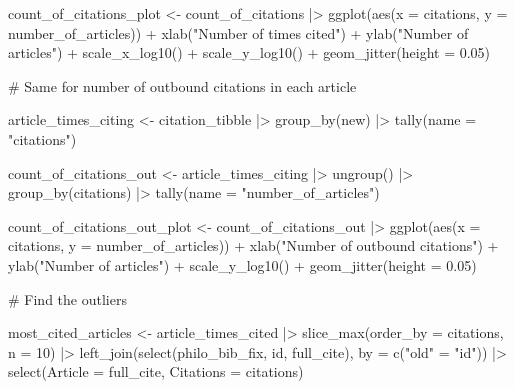 \documentclass[
  10pt,
  letterpaper,
  DIV=11,
  numbers=noendperiod,
  twoside]{scrartcl}
\newenvironment{Shaded}{\begin{snugshade}}{\end{snugshade}}
\newcommand{\AttributeTok}[1]{\textcolor[rgb]{0.40,0.45,0.13}{#1}}
\newcommand{\CommentTok}[1]{\textcolor[rgb]{0.37,0.37,0.37}{#1}}
\newcommand{\DecValTok}[1]{\textcolor[rgb]{0.68,0.00,0.00}{#1}}
\newcommand{\FloatTok}[1]{\textcolor[rgb]{0.68,0.00,0.00}{#1}}
\newcommand{\FunctionTok}[1]{\textcolor[rgb]{0.28,0.35,0.67}{#1}}
\newcommand{\NormalTok}[1]{\textcolor[rgb]{0.00,0.23,0.31}{#1}}
\newcommand{\OtherTok}[1]{\textcolor[rgb]{0.00,0.23,0.31}{#1}}
\newcommand{\SpecialCharTok}[1]{\textcolor[rgb]{0.37,0.37,0.37}{#1}}
\newcommand{\StringTok}[1]{\textcolor[rgb]{0.13,0.47,0.30}{#1}}
\begin{document}
\begin{Shaded}
\begin{Highlighting}[]
\NormalTok{count\_of\_citations\_plot }\OtherTok{\textless{}{-}}\NormalTok{ count\_of\_citations }\SpecialCharTok{|\textgreater{}}
  \FunctionTok{ggplot}\NormalTok{(}\FunctionTok{aes}\NormalTok{(}\AttributeTok{x =}\NormalTok{ citations, }\AttributeTok{y =}\NormalTok{ number\_of\_articles)) }\SpecialCharTok{+}
  \FunctionTok{xlab}\NormalTok{(}\StringTok{"Number of times cited"}\NormalTok{) }\SpecialCharTok{+}
  \FunctionTok{ylab}\NormalTok{(}\StringTok{"Number of articles"}\NormalTok{) }\SpecialCharTok{+}
  \FunctionTok{scale\_x\_log10}\NormalTok{() }\SpecialCharTok{+}
  \FunctionTok{scale\_y\_log10}\NormalTok{() }\SpecialCharTok{+}
  \FunctionTok{geom\_jitter}\NormalTok{(}\AttributeTok{height =} \FloatTok{0.05}\NormalTok{)}

\CommentTok{\# Same for number of outbound citations in each article}

\NormalTok{article\_times\_citing }\OtherTok{\textless{}{-}}\NormalTok{ citation\_tibble }\SpecialCharTok{|\textgreater{}}
  \FunctionTok{group\_by}\NormalTok{(new) }\SpecialCharTok{|\textgreater{}}
  \FunctionTok{tally}\NormalTok{(}\AttributeTok{name =} \StringTok{"citations"}\NormalTok{)}

\NormalTok{count\_of\_citations\_out }\OtherTok{\textless{}{-}}\NormalTok{ article\_times\_citing }\SpecialCharTok{|\textgreater{}}
  \FunctionTok{ungroup}\NormalTok{() }\SpecialCharTok{|\textgreater{}}
  \FunctionTok{group\_by}\NormalTok{(citations) }\SpecialCharTok{|\textgreater{}}
  \FunctionTok{tally}\NormalTok{(}\AttributeTok{name =} \StringTok{"number\_of\_articles"}\NormalTok{)}

\NormalTok{count\_of\_citations\_out\_plot }\OtherTok{\textless{}{-}}\NormalTok{ count\_of\_citations\_out }\SpecialCharTok{|\textgreater{}}
  \FunctionTok{ggplot}\NormalTok{(}\FunctionTok{aes}\NormalTok{(}\AttributeTok{x =}\NormalTok{ citations, }\AttributeTok{y =}\NormalTok{ number\_of\_articles)) }\SpecialCharTok{+}
  \FunctionTok{xlab}\NormalTok{(}\StringTok{"Number of outbound citations"}\NormalTok{) }\SpecialCharTok{+}
  \FunctionTok{ylab}\NormalTok{(}\StringTok{"Number of articles"}\NormalTok{) }\SpecialCharTok{+}
  \FunctionTok{scale\_y\_log10}\NormalTok{() }\SpecialCharTok{+}
  \FunctionTok{geom\_jitter}\NormalTok{(}\AttributeTok{height =} \FloatTok{0.05}\NormalTok{)}

\CommentTok{\# Find the outliers}

\NormalTok{most\_cited\_articles }\OtherTok{\textless{}{-}}\NormalTok{ article\_times\_cited }\SpecialCharTok{|\textgreater{}}
  \FunctionTok{slice\_max}\NormalTok{(}\AttributeTok{order\_by =}\NormalTok{ citations, }\AttributeTok{n =} \DecValTok{10}\NormalTok{) }\SpecialCharTok{|\textgreater{}}
  \FunctionTok{left\_join}\NormalTok{(}\FunctionTok{select}\NormalTok{(philo\_bib\_fix, id, full\_cite), }\AttributeTok{by =} \FunctionTok{c}\NormalTok{(}\StringTok{"old"} \OtherTok{=} \StringTok{"id"}\NormalTok{)) }\SpecialCharTok{|\textgreater{}}
  \FunctionTok{select}\NormalTok{(}\AttributeTok{Article =}\NormalTok{ full\_cite, }\AttributeTok{Citations =}\NormalTok{ citations)}



\end{Highlighting}
\end{Shaded}
\end{document}
